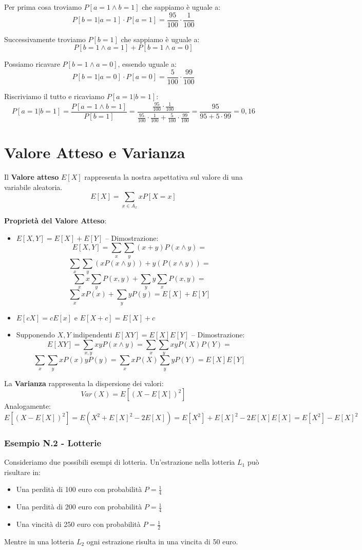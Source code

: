 Per prima cosa troviamo $P[a=1 \wedge b=1]$ che sappiamo è uguale a:
$$
P[b=1|a=1]\cdot P[a=1] = \frac{95}{100} \cdot \frac{1}{100}
$$

Successivamente troviamo $P[b=1]$ che sappiamo è uguale a:
$$
P[b=1 \wedge a=1] + P[b=1 \wedge a=0]
$$

Possiamo ricavare $P[b=1 \wedge a=0]$, essendo uguale a:
$$
P[b=1 | a=0] \cdot P[a=0] = \frac{5}{100} \cdot \frac{99}{100}
$$

Riscriviamo il tutto e ricaviamo $P[a=1|b=1]$:
$$
P[a=1|b=1] =  \frac{P[a=1 \wedge b=1]}{P[b=1]} = \frac{\frac{95}{100} \cdot\frac{1}{100}}{\frac{95}{100} \cdot\frac{1}{100} + \frac{5}{100} \cdot \frac{99}{100}} = \frac{95}{95 + 5 \cdot 99} = 0,16
$$

\newpage

\section{Valore Atteso e Varianza}

Il \textbf{Valore atteso} $E[X]$ rappresenta la nostra aspettativa sul valore di una variabile aleatoria. 
\begin{equation}
	E[X] = \sum_{x\in A_x}xP[X=x]
\end{equation}

\textbf{Proprietà del Valore Atteso}:
\begin{itemize}
	\item $E[X,Y] = E[X]+E[Y]$ -- Dimostrazione:\\ $$E[X,Y]=\sum_x\sum_y(x+y)P(x\wedge y) = $$ 
	$$\sum_x \sum_y (xP(x\wedge y))+y(P(x\wedge y)) = $$
	$$ \sum_x x \sum_y P(x,y) + \sum_y y \sum_x P(x,y) = $$
	$$\sum_x x P(x) + \sum_y y P(y) = E[X] +E[Y]$$
	\item $E[cX] = cE[x]$ e $E[X+c] = E[X] + c$
	\item Supponendo $X,Y$ indipendenti $E[XY] = E[X]E[Y]$ -- Dimostrazione:\\
	$$E[XY] = \sum_{x,y} xyP(x\wedge y) = \sum_x\sum_y xy P(X)P(Y)= $$
	$$\sum_x\sum_y xP(x)yP(y) = \sum_x xP(X)\sum_y yP(Y) = E[X]E[Y]$$
\end{itemize}

La \textbf{Varianza} rappresenta la dispersione dei valori: $$Var(X)=E[(X-E[X])^2]$$  
Analogamente: 
$$ 
E[(X-E[X])^2]= E(X^2+E[X]^2-2E[X])=E[X^2]+E[X]^2-2E[X]E[X]=
E[X^2]-E[X]^2
$$

\newpage
\subsubsection{Esempio N.2 - Lotterie}
Consideriamo due possibili esempi di lotteria. Un'estrazione nella lotteria $L_1$ può risultare in:
\begin{itemize}
	\item Una perdità di 100 euro con probabilità $P=\frac{1}{4}$
	\item Una perdità di 200 euro con probabilità $P=\frac{1}{4}$
	\item Una vincità di 250 euro con probabilità
	$P=\frac{1}{2}$
\end{itemize}
Mentre in una lotteria $L_2$ ogni estrazione risulta in una vincita di 50 euro.

